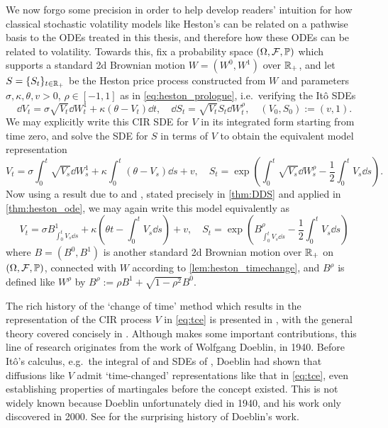 We now forgo some precision in order to help develop readers' intuition for how classical stochastic volatility models like Heston's can be related on a pathwise basis to the ODEs treated in this thesis, and therefore how these ODEs can be related to volatility. Towards this, fix a probability space $(\Omega,\mathcal{F},\mathbb{P})$ which supports a standard 2d Brownian motion $W=(W^0,W^1)$ over $\mathbb{R}_+$, and let $S=\{S_t\}_{t\in\mathbb{R}_+}$ be the Heston price process constructed from $W$ and parameters $\sigma,\kappa,\theta,v>0$, $\rho\in[-1,1]$ as in \autoref{eq:heston_prologue}, i.e.~verifying the It\^o SDEs
\begin{equation}\label{eq:heston_intro}
    \dd V_t = \sigma\sqrt{V_t}\dd W^1_t + \kappa(\theta - V_t)\dd t,\quad \dd S_t = \sqrt{V_t}S_t\dd W^{\rho}_t,\quad (V_0,S_0) := (v,1).
\end{equation}
We may explicitly write this CIR SDE for $V$ in its integrated form starting from time zero, and solve the SDE for $S$ in terms of $V$ to obtain the equivalent model representation
\begin{equation}\label{eq:heston_intro2}
    V_t = \sigma\int_0^t\sqrt{V_s}\dd W^1_s + \kappa\int_0^t(\theta - V_s)\dd s + v,\quad S_t = \exp\left(\int_0^t\sqrt{V_s}\dd W^{\rho}_s-\frac12\int_0^t V_s\dd s\right).
\end{equation}
Now using a result due to \cite{dambis_1965} and \cite{dubins_1965}, stated precisely in \autoref{thm:DDS} and applied in \autoref{thm:heston_ode}, we may again write this model equivalently as
\begin{equation}\label{eq:tce}
    V_t = \sigma B^1_{\int_0^t V_s\dd s} + \kappa\left(\theta t - \int_0^t V_s\dd s\right) + v,\quad S_t = \exp\left(B^\rho_{\int_0^t V_s\dd s} - \frac12\int_0^t V_s\dd s\right)
\end{equation}
where $B=(B^0,B^1)$ is another standard 2d Brownian motion over $\mathbb{R}_+$ on $(\Omega,\mathcal{F},\mathbb{P})$, connected with $W$ according to \autoref{lem:heston_timechange}, and $B^\rho$ is defined like $W^\rho$ by $B^\rho:=\rho B^1+\sqrt{1-\rho^2}B^0$.

The rich history of the `change of time' method which results in the representation of the CIR process $V$ in \autoref{eq:tce} is presented in \cite{swishchuk_2016}, with the general theory covered concisely in \cite{barndorff-nielsen_2010}. Although \cite{ikeda_1989} makes some important contributions, this line of research originates from the work of Wolfgang Doeblin, in 1940. Before It\^o's calculus, e.g.~the integral of \cite{ito_1944} and SDEs of \cite{ito_1951}, Doeblin had shown that diffusions like $V$ admit `time-changed' representations like that in \autoref{eq:tce}, even establishing properties of martingales before the concept existed. This is not widely known because Doeblin unfortunately died in 1940, and his work only discovered in 2000. See \cite{bru_2002} for the surprising history of Doeblin's work.

